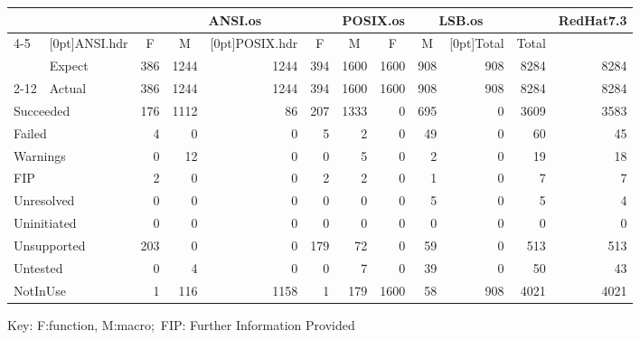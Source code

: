 \begin{table*}[t]
\begin{center}
\footnotesize
\begin{tabular}{|l|l||r|r|r|r|r|r|r|r|r||r|}
 \hline
 \multicolumn{2}{|c||}{} & & \multicolumn{2}{|c|}{ANSI.os} 
 &  & \multicolumn{2}{|c|}{POSIX.os} & \multicolumn{2}{|c|}{LSB.os}
 &  & RedHat7.3 \\
 \cline{4-5} \cline{7-10}
 \multicolumn{2}{|c||}{\raisebox{1.3ex}[0pt]{Section}} 
 & \multicolumn{1}{|c|}{\raisebox{1.3ex}[0pt]{ANSI.hdr}} 
 & \multicolumn{1}{|c|}{F} & \multicolumn{1}{|c|}{M} 
 & \multicolumn{1}{|c|}{\raisebox{1.3ex}[0pt]{POSIX.hdr}}
 & \multicolumn{1}{|c|}{F} & \multicolumn{1}{|c|}{M} 
 & \multicolumn{1}{|c|}{F} & \multicolumn{1}{|c|}{M} 
 & \multicolumn{1}{|c||}{\raisebox{1.3ex}[0pt]{Total}} & Total \\
 \hline
 \hline
 & Expect 
 & 386 & 1244 & 1244 & 394 & 1600 & 1600 & 908 & 908 & 8284 & 8284 \\
 \cline{2-12}
 \multicolumn{1}{|c|}{\raisebox{1.3ex}[0pt]{Total}} 
 & Actual 
 & 386 & 1244 & 1244 & 394 & 1600 & 1600 & 908 & 908 & 8284 & 8284 \\
 \hline
 \multicolumn{2}{|l||}{Succeeded} 
 & 176 & 1112 & 86 & 207 & 1333 & 0 & 695 & 0 & 3609 & 3583 \\
 \multicolumn{2}{|l||}{Failed} 
 & 4 & 0 & 0 & 5 & 2 & 0 & 49 & 0 & 60 & 45 \\
 \multicolumn{2}{|l||}{Warnings} 
 & 0 & 12 & 0 & 0 & 5 & 0 & 2 & 0 & 19 & 18 \\
 \multicolumn{2}{|l||}{FIP} 
 & 2 & 0 & 0 & 2 & 2 & 0 & 1 & 0 & 7 & 7 \\
 \multicolumn{2}{|l||}{Unresolved} 
 & 0 & 0 & 0 & 0 & 0 & 0 & 5 & 0 & 5 & 4 \\
 \multicolumn{2}{|l||}{Uninitiated} 
 & 0 & 0 & 0 & 0 & 0 & 0 & 0 & 0 & 0 & 0 \\
 \multicolumn{2}{|l||}{Unsupported} 
 & 203 & 0 & 0 & 179 & 72 & 0 & 59 & 0 & 513 & 513 \\
 \multicolumn{2}{|l||}{Untested} 
 & 0 & 4 & 0 & 0 & 7 & 0 & 39 & 0 & 50 & 43 \\
 \multicolumn{2}{|l||}{NotInUse} 
 & 1 & 116 & 1158 & 1 & 179 & 1600 & 58 & 908 & 4021 & 4021 \\
 \hline
\end{tabular}
Key: F:function, M:macro;\ FIP: Further Information Provided
\end{center}
\hspace{5mm} 
\caption{LSB 1.2 testsuites result}
\label{lsb_result}
\end{table*}

